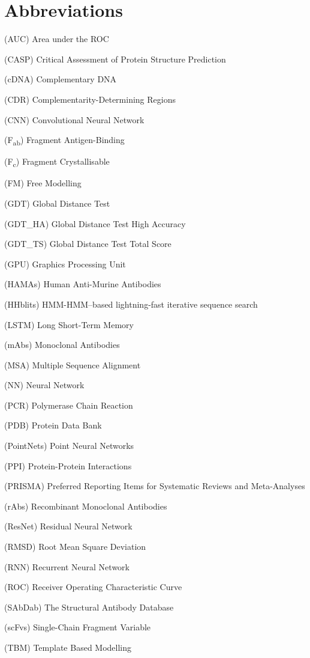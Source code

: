 

\section{Abbreviations}

\noindent(AUC) Area under the ROC

\noindent(CASP) Critical Assessment of Protein Structure Prediction \cite{kryshtafovychCriticalAssessmentMethods2019}

\noindent(cDNA) Complementary DNA

\noindent(CDR) Complementarity-Determining Regions

\noindent(CNN) Convolutional Neural Network

\noindent(F\textsubscript{ab}) Fragment Antigen-Binding

\noindent(F\textsubscript{c}) Fragment Crystallisable 

\noindent(FM) Free Modelling

\noindent(GDT) Global Distance Test

\noindent(GDT\_HA) Global Distance Test High Accuracy

\noindent(GDT\_TS) Global Distance Test Total Score

\noindent(GPU) Graphics Processing Unit

\noindent(HAMAs) Human Anti-Murine Antibodies

\noindent(HHblits) HMM-HMM–based lightning-fast iterative sequence search

\noindent(LSTM) Long Short-Term Memory

\noindent(mAbs) Monoclonal Antibodies

\noindent(MSA) Multiple Sequence Alignment

\noindent(NN) Neural Network

\noindent(PCR)  Polymerase Chain Reaction

\noindent(PDB) Protein Data Bank \cite{bermanProteinDataBank2000a}

\noindent(PointNets) Point Neural Networks

\noindent(PPI) Protein-Protein Interactions

\noindent(PRISMA) Preferred Reporting Items for Systematic Reviews and Meta-Analyses \cite{pagePRISMA2020Statement2021}

\noindent(rAbs) Recombinant Monoclonal Antibodies

\noindent(ResNet) Residual Neural Network

\noindent(RMSD) Root Mean Square Deviation

\noindent(RNN) Recurrent Neural Network

\noindent(ROC) Receiver Operating Characteristic Curve

\noindent(SAbDab) The Structural Antibody Database \cite{dunbarSAbDabStructuralAntibody2014}

\noindent(scFvs) Single-Chain Fragment Variable

\noindent(TBM) Template Based Modelling
